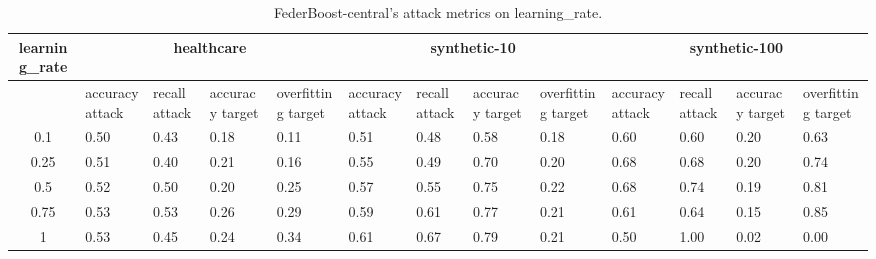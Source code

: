 \begin{table*}[]\centering
\begin{tabular}{|c| *{12}{m{1.0cm}|}}
\hline\rowcolor{gray!50}
\cellcolor{gray!80} learning_rate & \multicolumn{4}{c|}{healthcare} & \multicolumn{4}{c|}{synthetic-10} & \multicolumn{4}{c|}{synthetic-100}\\\hline 
& accuracy attack & recall attack & accuracy target & overfitting target & accuracy attack & recall attack & accuracy target & overfitting target & accuracy attack & recall attack & accuracy target & overfitting target\\\hline
0.1 & 0.50 & 0.43 & 0.18 & 0.11 & 0.51 & 0.48 & 0.58 & 0.18 & 0.60 & 0.60 & 0.20 & 0.63\\ \hline
0.25 & 0.51 & 0.40 & 0.21 & 0.16 & 0.55 & 0.49 & 0.70 & 0.20 & 0.68 & 0.68 & 0.20 & 0.74\\ \hline
0.5 & 0.52 & 0.50 & 0.20 & 0.25 & 0.57 & 0.55 & 0.75 & 0.22 & 0.68 & 0.74 & 0.19 & 0.81\\ \hline
0.75 & 0.53 & 0.53 & 0.26 & 0.29 & 0.59 & 0.61 & 0.77 & 0.21 & 0.61 & 0.64 & 0.15 & 0.85\\ \hline
1 & 0.53 & 0.45 & 0.24 & 0.34 & 0.61 & 0.67 & 0.79 & 0.21 & 0.50 & 1.00 & 0.02 & 0.00\\ \hline
\end{tabular} 
\caption{FederBoost-central's attack metrics on learning_rate.}
\label{tab:experiment1_learning_rate}
\end{table*}
